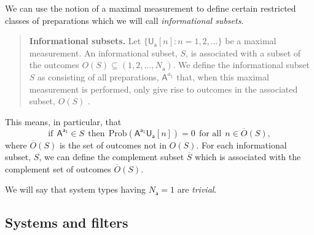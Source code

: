 \documentclass[10pt]{article}
\begin{document}
We can use the notion of a maximal measurement to define certain restricted classes of preparations which we will call \emph{informational subsets}.
\begin{quote}
{\bf Informational subsets.}  Let $\{ \mathsf{U}_\mathsf{a}[n]: n=1, 2, \dots\}$ be a maximal measurement. An informational subset, $S$, is associated with a subset of the outcomes $O(S) \subseteq (1, 2, \dots, N_\mathsf{a})$.   We define the informational subset $S$ as consisting of all preparations, $\mathsf A^{a_1}$ that, when this maximal measurement is performed, only give rise to outcomes in the associated subset, $O(S)$ .
\end{quote}
This means, in particular, that
\begin{equation}
\text{if}~~ \mathsf{A^{a_1}}\in S ~~\text{then}~~ \text{Prob}(\mathsf{A^{a_1}} \mathsf{U}_\mathsf{a}[n])=0 ~~ \text{for all}~~ n\in \overline O(S),
\end{equation}
where $\overline O(S)$ is the set of outcomes not in $O(S)$.  For each informational subset, $S$, we can define the complement subset $\overline S$ which is associated with the complement set of outcomes $\overline O(S)$.

We will say that system types having $N_\mathsf{a}=1$ are \emph{trivial}.

\subsection{Systems and filters}\label{systemsandfilterssection}
\end{document}
